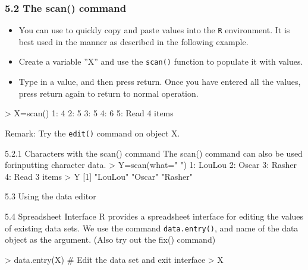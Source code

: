  \frametitle{5.2 The scan() command}
 \begin{itemize}
 \itemThe \texttt{scan()} function is a useful method of inputting data quickly. 
 \item You can use to quickly copy
 and paste values into the \texttt{R} environment. It is best used in the manner as described in the
 following example. 
 \item Create a variable ”X” and use the \texttt{scan()} function to populate it with
 values. 
 \item Type in a value, and then press return. Once you have entered all the values, press
 return again to return to normal operation.
 \end{itemize}
 
 
 \begin{semiverbatim}
 > X=scan()
 1: 4
 2: 5
 3: 5
 4: 6
 5:
 Read 4 items
 \end{semiverbatim}
 Remark: Try the \texttt{edit()} command on object X.
 
 
 5.2.1 Characters with the scan() command
 The scan() command can also be used forinputting character data.
 > Y=scan(what=" ")
 1: LouLou
 2: Oscar
 3: Rasher
 4:
 Read 3 items
 > Y
 [1] "LouLou" "Oscar" "Rasher"
 
 
 5.3 Using the data editor
 
 
 
 5.4 Spreadsheet Interface
 R provides a spreadsheet interface for editing the values of existing data sets. We use the
 command \texttt{data.entry()}, and name of the data object as the argument. (Also try out the
 fix() command)
 \begin{framed}
 \begin{semiverbatim}
 > data.entry(X) # Edit the data set and exit interface
 > X
 \end{semiverbatim}
 \end{framed}
 
 
 
 
 
 
 

